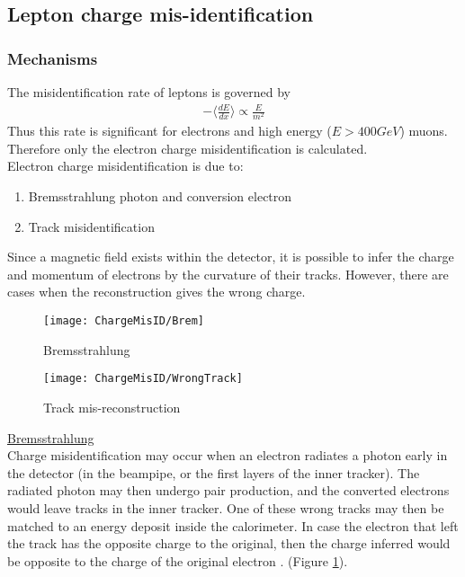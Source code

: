 \subsection{Lepton charge mis-identification}

\subsubsection*{Mechanisms}
The misidentification rate of leptons is governed by \\
\begin{align}
-\langle\frac{dE}{dx}\rangle \varpropto \frac{E}{m^2}
\end{align}
Thus this rate is significant for electrons and high energy ($E > 400GeV$) muons. Therefore only the electron charge misidentification is calculated. \\

Electron charge misidentification is due to:
\begin{enumerate}
\item Bremsstrahlung photon and conversion electron
\item Track misidentification
\end{enumerate}

Since a magnetic field exists within the detector, it is possible to infer the charge and momentum of electrons by the curvature of their tracks. However, there are cases when the reconstruction gives the wrong charge. 

\begin{figure}[h]
\centering
\texttt{[image: ChargeMisID/Brem]}
\caption[Electron charge misidentification by bremsstrahlung]{Bremsstrahlung}
\label{fig:brem}
\end{figure}
\begin{figure}[h]
\centering
\texttt{[image: ChargeMisID/WrongTrack]}
\caption[Electron charge misidentification by track mis-reconstruction]{Track mis-reconstruction}
\label{fig:wrong-track}
\end{figure}

\underline{Bremsstrahlung} \\
Charge misidentification may occur when an electron radiates a photon early in the detector (in the beampipe, or the first layers of the inner tracker). The radiated photon may then undergo pair production, and the converted electrons would leave tracks in the inner tracker.  One of these wrong tracks may then be matched to an energy deposit inside the calorimeter. In case the electron that left the track has the opposite charge to the original, then the charge inferred would be opposite to the charge of the original electron \cite{ElectronReco2011}. (Figure \ref{fig:brem}). 


